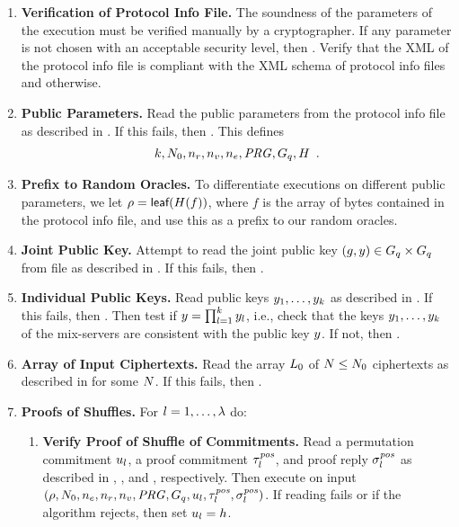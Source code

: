 \documentclass[11pt]{article}
\begin{document}
\begin{enumerate}

\item\textbf{Verification of Protocol Info File.} The soundness of the
  parameters of the execution must be verified manually by a
  cryptographer. If any parameter is not chosen with an acceptable
  security level, then \reject. Verify that the XML of the protocol
  info file is compliant with the XML schema of protocol info files
  and \reject otherwise.

\item\textbf{Public Parameters.} Read the public parameters from the
  protocol info file as described in . If this fails,
  then \reject. This defines
  \begin{align*}
    k,N_{0},n_r,n_v,{n_e},\mathit{PRG},G_{q},H\enspace.
  \end{align*}

\item\label{step:roprefix}\textbf{Prefix to Random Oracles.} To
  differentiate executions on different public parameters, we let
  $\rho=\textsf{leaf}(H(f))$, where $f$ is the array of bytes contained in
  the protocol info file, and use this as a prefix to our random
  oracles.

\item\textbf{Joint Public Key.} Attempt to read the joint public key
  $(g,y)\in G_{q}\times G_{q}$ from file as described in . If
  this fails, then \reject.

\item\textbf{Individual Public Keys.} Read public keys
  $y_{1},\ldots,y_{k}$ as described in . If this fails,
  then \reject. Then test if $y=\prod_{l=1}^{k}y_{l}$, i.e., check
  that the keys $y_{1},\ldots,y_{k}$ of the mix-servers are
  consistent with the public key $y$. If not, then \reject.

\item\textbf{Array of Input Ciphertexts.} Read the array $L_{0}$ of
  $N\leq N_{0}$ ciphertexts as described in  for some
  $N$. If this fails, then \reject.

\item\textbf{Proofs of Shuffles.} For $l=1,\ldots,\lambda$ do:
  \begin{enumerate}

  \item\textbf{Verify Proof of Shuffle of Commitments.}  Read a
    permutation commitment $u_{l}$, a proof commitment
    $\tau_{l}^{\mathit{pos}}$, and proof reply $\sigma_{l}^{\mathit{pos}}$ as described in
    , , and ,
    respectively. Then execute
     on input\\
    $(\rho,N_{0},{n_e},n_r,n_v,\mathit{PRG},G_{q},u_{l},\tau_{l}^{\mathit{pos}},\sigma_{l}^{\mathit{pos}})$. If
    reading fails or if the algorithm rejects, then set
    $u_{l}=h$.


\end{enumerate}
\end{enumerate}
\end{document}
